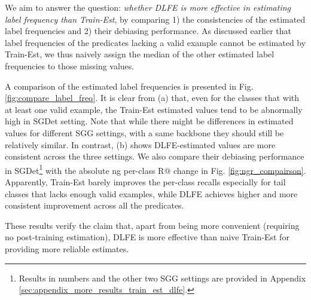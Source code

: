 \documentclass[sigconf]{acmart}
\begin{document}
We aim to answer the question: \textit{whether DLFE is more effective in estimating label frequency than Train-Est}, by comparing 1) the consistencies of the estimated label frequencies and 2) their debiasing performance.
As discussed earlier that label frequencies of the predicates lacking a valid example cannot be estimated by Train-Est, we thus naively assign the median of the other estimated label frequencies to those missing values.

A comparison of the estimated label frequencies is presented in Fig. \ref{fig:compare_label_freq}.
It is clear from (a) that, even for the classes that with at least one valid example, the Train-Est estimated values tend to be abnormally high in SGDet setting.
Note that while there might be differences in estimated values for different SGG settings, with a same backbone they should still be relatively similar.
In contrast, (b) shows DLFE-estimated values are more consistent across the three settings.
We also compare their debiasing performance in SGDet\footnote{Results in numbers and the other two SGG settings are provided in Appendix \ref{sec:appendix_more_results_train_est_dlfe}.} with the absolute ng per-class R@ change in Fig. \ref{fig:ngr_compairson}.
Apparently, Train-Est barely improves the per-class recalls especially for tail classes that lacks enough valid examples, while DLFE achieves higher and more consistent improvement across all the predicates.

These results verify the claim that, apart from being more convenient (requiring no post-training estimation), DLFE is more effective than naive Train-Est for providing more reliable estimates.
\end{document}
